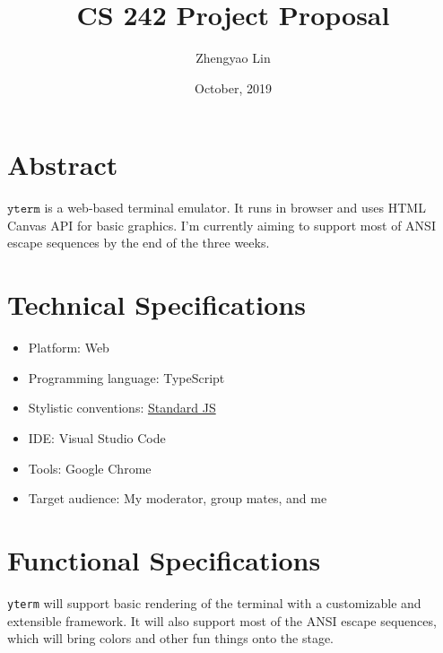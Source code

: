 \documentclass[11pt]{article}
\begin{document}
    \title{CS 242 Project Proposal}
    \author{Zhengyao Lin}
    \date{October, 2019}
    \maketitle
    
    \section{Abstract}
        $\mathtt{yterm}$ is a web-based terminal emulator. It runs in browser and uses HTML Canvas API for basic graphics. I'm currently aiming to support most of ANSI escape sequences by the end of the three weeks.
    
    \section{Technical Specifications}
        \begin{itemize}
            \item Platform: Web
            \item Programming language: TypeScript
            \item Stylistic conventions: \href{https://standardjs.com}{Standard JS}
            \item IDE: Visual Studio Code
            \item Tools: Google Chrome
            \item Target audience: My moderator, group mates, and me
        \end{itemize}
    
    \section{Functional Specifications}
        \texttt{yterm} will support basic rendering of the terminal with a customizable and extensible framework. It will also support most of the ANSI escape sequences, which will bring colors and other fun things onto the stage.
        
\end{document}
